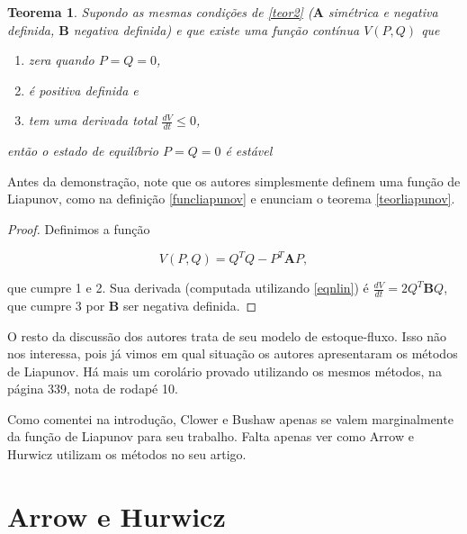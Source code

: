 \documentclass[
	12pt,				%
	openright,			%
	twoside,			%
	a4paper,			%
	english,			%
	french,				%
	spanish,			%
	brazil				%
	]{abntex2}
\newtheorem{teorema}{Teorema}[chapter]
\newcommand{\B}{\boldsymbol{B}}
\newcommand{\A}{\boldsymbol{A}}
\begin{document}
\begin{teorema}
	Supondo as mesmas condições de \ref{teor2} ($\A$ simétrica e negativa definida,
	$\B$ negativa definida) e que existe uma função contínua $V(P, Q)$ que
	\begin{enumerate}
		\item zera quando $P = Q = 0$,
		\item é positiva definida e
		\item tem uma derivada total $\frac{dV}{dt} \leq 0$,
	\end{enumerate}

	então o estado de equilíbrio $P = Q = 0$ é estável
\end{teorema}

Antes da demonstração, note que os autores simplesmente definem uma função de Liapunov, como
na definição \ref{funcliapunov} e enunciam o teorema \ref{teorliapunov}.

\begin{proof}
	Definimos a função

	\begin{equation}
		V(P, Q) = Q^T Q - P^T \A P,
	\end{equation}

	que cumpre 1 e 2. Sua derivada (computada utilizando \ref{eqnlin}) é
	$\displaystyle \frac{dV}{dt} = 2Q^T \B Q$, que cumpre 3 por $\B$ ser negativa definida.
\end{proof}

O resto da discussão dos autores trata de seu modelo de estoque-fluxo.
Isso não nos interessa, pois já vimos em qual situação os autores apresentaram
os métodos de Liapunov. Há mais um corolário provado utilizando os mesmos métodos,
na página 339, nota de rodapé 10.

Como comentei na introdução, Clower e Bushaw apenas se valem marginalmente
da função de Liapunov para seu trabalho. Falta apenas ver como Arrow e Hurwicz
utilizam os métodos no seu artigo.

\part{Arrow e Hurwicz}

\end{document}
